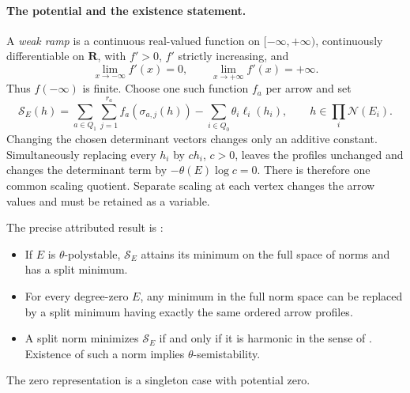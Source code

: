 \paragraph{The potential and the existence statement.}
A \emph{weak ramp} is a continuous real-valued function on
$[-\infty,+\infty)$, continuously differentiable on $\mathbf R$, with
$f'>0$, $f'$ strictly increasing, and
\[
 \lim_{x\to-\infty}f'(x)=0,\qquad
 \lim_{x\to+\infty}f'(x)=+\infty.
\]
Thus $f(-\infty)$ is finite. Choose one such function $f_a$ per arrow and set
\[
 \mathscr S_E(h)=
       \sum_{a\in Q_1}\sum_{j=1}^{r_a}f_a(\sigma_{a,j}(h))
       -\sum_{i\in Q_0}\theta_i\ell_i(h_i),
 \qquad h\in\prod_i\mathcal N(E_i).
\tag{50.90c}\label{eq:ch50-quiver-potential}
\]
Changing the chosen determinant vectors changes only an additive constant.
Simultaneously replacing every $h_i$ by $ch_i$, $c>0$, leaves the profiles
unchanged and changes the determinant term by $-\theta(E)\log c=0$.
There is therefore one common scaling quotient. Separate scaling at each
vertex changes the arrow values and must be retained as a variable.

The precise attributed result is
\cite[Theorems~1.1, 3.10 and 5.4; Corollary~4.2]{BB26HarmonicQuiverV1}:
\begin{itemize}
\item If $E$ is $\theta$-polystable, $\mathscr S_E$ attains its minimum
on the full space of norms and has a split minimum.
\item For every degree-zero $E$, any minimum in the full norm space
can be replaced by a split minimum having exactly the same ordered
arrow profiles.
\item A split norm minimizes $\mathscr S_E$ if and only if it is
harmonic in the sense of \cite[Definition~6.20]{HKKP26CategoricalV1}.
Existence of such a norm implies $\theta$-semistability.
\end{itemize}
The zero representation is a singleton case with potential zero.

